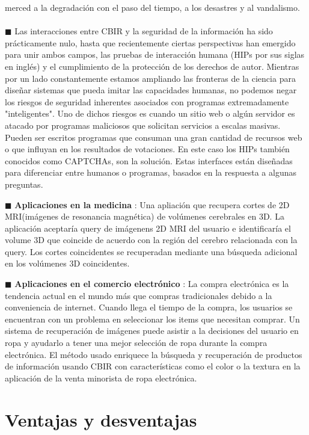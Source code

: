 \documentclass{llncs}
\begin{document}
merced a la degradación con el paso del tiempo, a los desastres y al vandalismo.
\\\\
\noindent $\blacksquare$ Las interacciones entre CBIR y la seguridad de la información ha sido prácticamente nulo, hasta que recientemente ciertas perspectivas 
han emergido  para unir ambos campos, las pruebas de interacción humana (HIPs por sus siglas en inglés) y el cumplimiento de 
la protección de los derechos de autor. Mientras por un lado constantemente estamos ampliando las fronteras de la ciencia para 
diseñar sistemas que pueda imitar las capacidades humanas, no podemos negar los riesgos de seguridad inherentes asociados con 
programas extremadamente "inteligentes". Uno de dichos riesgos es cuando un sitio web o algún servidor es atacado por programas 
maliciosos que solicitan servicios a escalas masivas. Pueden ser escritos programas que consuman una gran cantidad de recursos web o 
que influyan en los resultados de votaciones. En este caso los HIPs también conocidos como CAPTCHAs, son la solución. Estas interfaces 
están diseñadas para diferenciar entre humanos o programas, basados en la respuesta a algunas preguntas.

\noindent $\blacksquare$ \textbf{Aplicaciones en la medicina} :
Una apliaci\'on que recupera cortes de 2D MRI(im\'agenes de resonancia magn\'etica)
de vol\'umenes cerebrales en 3D. La aplicaci\'on aceptar\'ia query de im\'agenens 2D MRI del usuario e identificar\'ia el volume 3D que coincide
de acuerdo con la  regi\'on del cerebro relacionada con la query. Los cortes coincidentes se recuperadan mediante una b\'usqueda adicional en los vol\'umenes
3D coincidentes.

\noindent $\blacksquare$ \textbf{Aplicaciones en el comercio electr\'onico} :
La compra electr\'onica es la tendencia actual en el mundo m\'as que compras tradicionales debido a la conveniencia de internet. Cuando llega 
el tiempo de la compra, los usuarios se encuentran con un problema en seleccionar los items que necesitan comprar. Un sistema de recuperaci\'on
de im\'agenes puede asistir a la decisiones del usuario en ropa y ayudarlo a tener una mejor selecci\'on de ropa durante la compra electr\'onica.
El m\'etodo usado enriquece la b\'usqueda y recuperaci\'on de productos de informaci\'on usando CBIR con caracter\'isticas como el color o la textura 
en la aplicaci\'on de la venta minorista de ropa electr\'onica.  


\chapter*{Ventajas y desventajas}
\end{document}
